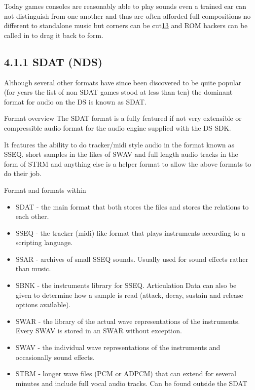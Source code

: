 \documentclass[
]{book}
\providecommand{\tightlist}{%
  \setlength{\itemsep}{0pt}\setlength{\parskip}{0pt}}
\begin{document}
Today games consoles are reasonably able to play sounds even a trained ear can not distinguish from one another and thus are often afforded full compositions no different to standalone music but corners can be cut\href{romhacking202014.html\#fn13x0}{13} and ROM hackers can be called in to drag it back to form.

\hypertarget{sdat-nds}{%
\subsection{4.1.1 SDAT (NDS)}\label{sdat-nds}}

Although several other formats have since been discovered to be quite popular (for years the list of non SDAT games stood at less than ten) the dominant format for audio on the DS is known as SDAT.

Format overview The SDAT format is a fully featured if not very extensible or compressible audio format for the audio engine supplied with the DS SDK.

It features the ability to do tracker/midi style audio in the format known as SSEQ, short samples in the likes of SWAV and full length audio tracks in the form of STRM and anything else is a helper format to allow the above formats to do their job.

Format and formats within

\begin{itemize}
\tightlist
\item
  SDAT - the main format that both stores the files and stores the relations to each other.
\item
  SSEQ - the tracker (midi) like format that plays instruments according to a scripting language.
\item
  SSAR - archives of small SSEQ sounds. Usually used for sound effects rather than music.
\item
  SBNK - the instruments library for SSEQ. Articulation Data can also be given to determine how a sample is read (attack, decay, sustain and release options available).
\item
  SWAR - the library of the actual wave representations of the instruments. Every SWAV is stored in an SWAR without exception.
\item
  SWAV - the individual wave representations of the instruments and occasionally sound effects.
\item
  STRM - longer wave files (PCM or ADPCM) that can extend for several minutes and include full vocal audio tracks. Can be found outside the SDAT
\end{itemize}
\end{document}
